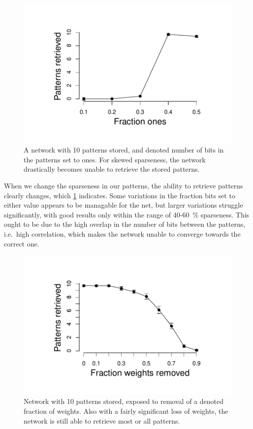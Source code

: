 \documentclass[10pt]{article}
\theoremstyle{plain}
\begin{document}
\begin{multicols*}{2}
\begin{figure}[H]
  \centering
  \includegraphics[trim={0 1cm 0 1.cm}, clip, scale=.5]{fraction_ones}
  \caption{A network with 10 patterns stored, and denoted number of bits in the
  patterns set to ones. For skewed sparseness, the network drastically becomes
unable to retrieve the stored patterns.}
  \label{fig:fraction_ones}
\end{figure}

When we change the sparseness in our patterns, the ability to retrieve patterns
clearly changes, which \cref{fig:fraction_ones} indicates. Some variations in
the fraction bits set to either value appears to be managable for the net, but
larger variations struggle significantly, with good results only within the
range of 40-60~\% sparseness. This ought to be due to the high overlap in
the number of bits between the patterns, i.e.\ high correlation, which makes the
network unable to converge towards the correct one. 

\begin{figure}[H]
  \centering
  \includegraphics[trim={0 1cm 0 1.cm}, clip, scale=.5]{weights_removed}
  \caption{Network with 10 patterns stored, exposed to removal of a denoted
  fraction of weights. Also with a fairly significant loss of weights, the
network is still able to retrieve most or all patterns.}
  \label{fig:weights_removed}
\end{figure}


\end{multicols*}
\end{document}
